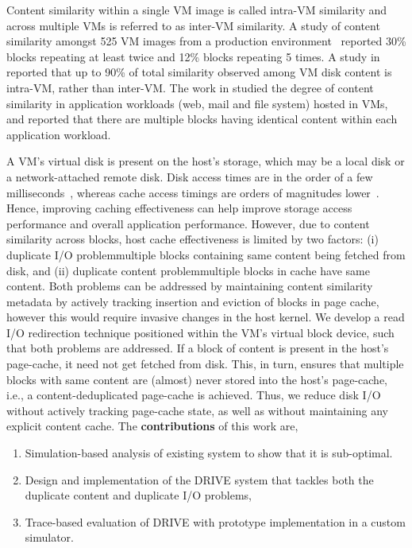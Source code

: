Content similarity within a single VM image is called intra-VM similarity and across multiple
VMs is referred to as inter-VM similarity. A study of content similarity amongst 525 VM images
from a production environment~\cite{similarity}
reported 30\% blocks repeating at least twice and 12\% blocks
repeating 5 times. A study in \cite{intra-higherthan-inter} 
reported that up to 90\% of total similarity observed among VM
disk content is intra-VM, rather than inter-VM. 
The work in \cite{iodedup} 
studied the degree of content
similarity in application workloads (web, mail and file system) hosted in VMs, and reported that
there are multiple blocks having identical content within each application workload.

A VM's virtual disk is present on the host's storage, which may be a local disk 
or a network-attached remote disk. 
Disk access times are in the order of a few 
milliseconds~\cite{google, data-domain}, whereas cache
access timings are orders of magnitudes lower~\cite{pagecache, satori}. 
Hence, improving caching effectiveness can
help improve storage access performance and overall application performance. However, due to
content similarity across blocks, host cache effectiveness is limited by two factors: (i) duplicate
I/O problem\textemdash{}multiple blocks containing same content being fetched from disk, 
and (ii) duplicate content problem\textemdash{}multiple blocks in cache have same content. 
Both problems can be
addressed by maintaining content similarity metadata by actively tracking insertion and eviction
of blocks in page cache, however this would require invasive changes in the host kernel.
We develop a read I/O redirection technique positioned within the VM's virtual block device,
such that both problems are addressed. If a block of content is present in the host's page-cache,
it need not get fetched from disk. This, in turn, ensures that multiple blocks with same content
are (almost) never stored into the host's page-cache, i.e., a content-deduplicated page-cache is
achieved. Thus, we reduce disk I/O without actively tracking page-cache state, as well as without
maintaining any explicit content cache. The \textbf{contributions} of this work are,
\begin{enumerate}
	\singlespacing
\item Simulation-based analysis of existing system \cite{iodedup} to show that it is sub-optimal.
\item Design and implementation of the DRIVE system that tackles both the duplicate content
and duplicate I/O problems,
\item Trace-based evaluation of DRIVE with prototype implementation in a custom simulator.
\end{enumerate}


